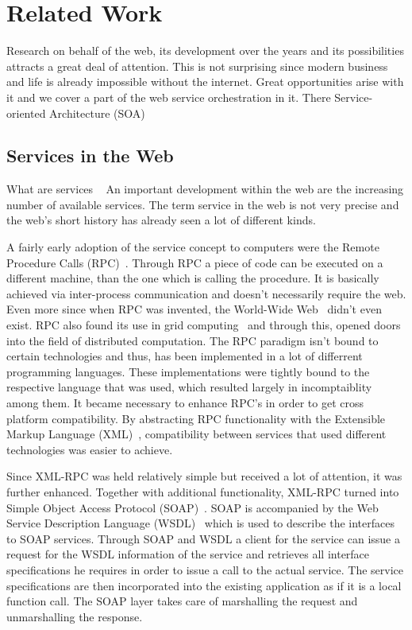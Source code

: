 
\chapter{Related Work}

Research on behalf of the web, its development over the years and its possibilities attracts a great deal of attention.
This is not surprising since modern business and life is already impossible without the internet.
Great opportunities arise with it and we cover a part of the web service orchestration in it.
There 
Service-oriented Architecture (SOA)~\cite{perrey2003service}

\section{Services in the Web}
What are services
~\cite{peltz2003web}
An important development within the web are the increasing number of available services.
The term service in the web is not very precise and the web's short history has already seen a lot of different kinds.

A fairly early adoption of the service concept to computers were the Remote Procedure Calls (RPC)~\cite{Birrell:1984:IRP:2080.357392}.
Through RPC a piece of code can be executed on a different machine, than the one which is calling the procedure.
It is basically achieved via inter-process communication and doesn't necessarily require the web.
Even more since when RPC was invented, the World-Wide Web~\cite{DBLP:journals/en/Berners-LeeCGP92} didn't even exist. 
RPC also found its use in grid computing~\cite{seymour2002overview} and through this, opened doors into the field of distributed computation.
The RPC paradigm isn't bound to certain technologies and thus, has been implemented in a lot of differrent programming languages.
These implementations were tightly bound to the respective language that was used, which resulted largely in incomptaiblity among them.
It became necessary to enhance RPC's in order to get cross platform compatibility.
By abstracting RPC functionality with the Extensible Markup Language (XML)~\cite{bray1998extensible}, compatibility between services that used different technologies was easier to achieve.

Since XML-RPC was held relatively simple but received a lot of attention, it was further enhanced.
Together with additional functionality, XML-RPC turned into Simple Object Access Protocol (SOAP)~\cite{box2000simple}.
SOAP is accompanied by the Web Service Description Language (WSDL)~\cite{christensen2001web} which is used to describe the interfaces to SOAP services.
Through SOAP and WSDL a client for the service can issue a request for the WSDL information of the service and retrieves all interface specifications he requires in order to issue a call to the actual service.
The service specifications are then incorporated into the existing application as if it is a local function call.
The SOAP layer takes care of marshalling the request and unmarshalling the response.

